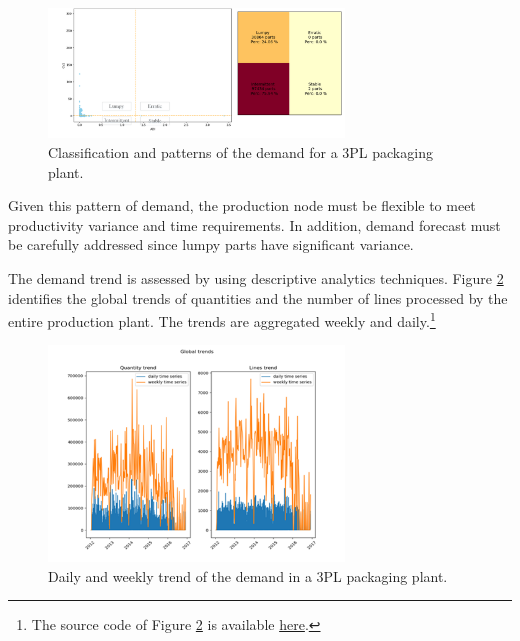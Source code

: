 \begin{figure}[hbt!]
\centering
\includegraphics[width=0.7\textwidth]{sectionProduction/control_figures/fig_prod_CHIMAR_demandPatterns.png}
\captionsetup{type=figure}
\caption{Classification and patterns of the demand for a 3PL packaging plant.}
\label{fig_prod_CHIMAR_demandPatterns}
\end{figure}

Given this pattern of demand, the production node must be flexible to meet productivity variance and time requirements. In addition, demand forecast must be carefully addressed since lumpy parts have significant variance. \par

The demand trend is assessed by using descriptive analytics techniques. Figure \ref{fig_prod_CHIMAR_trend} identifies the global trends of quantities and the number of lines processed by the entire production plant. The trends are aggregated weekly and daily.\footnote{The source code of Figure \ref{fig_prod_CHIMAR_trend} is available \href{https://github.com/aletuf93/logproj/blob/master/examples/LOG_01\%20Demand\%20assessment.ipynb}{here}.}

\begin{figure}[hbt!]
\centering
\includegraphics[width=0.7\textwidth]{sectionProduction/control_figures/fig_prod_CHIMAR_trend.png}
\captionsetup{type=figure}
\caption{Daily and weekly trend of the demand in a 3PL packaging plant.}
\label{fig_prod_CHIMAR_trend}
\end{figure}

